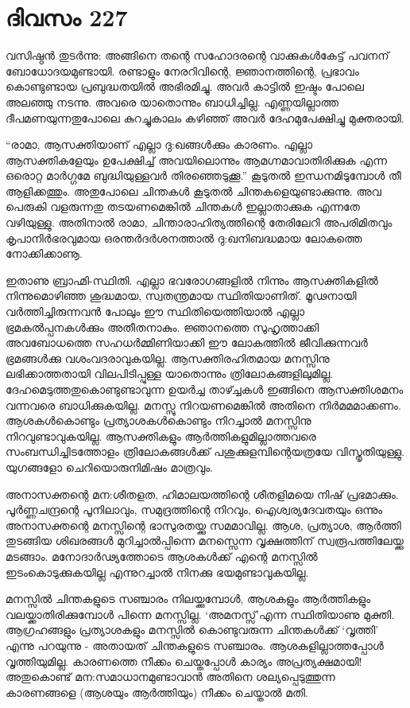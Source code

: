 \section{ദിവസം 227}


വസിഷ്ഠൻ തുടർന്നു: അങ്ങിനെ തന്റെ സഹോദരന്റെ വാക്കുകള്‍കേട്ട് പവനന്‌ ബോധോദയമുണ്ടായി. രണ്ടാളും നേരറിവിന്റെ, ജ്ഞാനത്തിന്റെ, പ്രഭാവം കൊണ്ടുണ്ടായ പ്രബുദ്ധതയിൽ അഭിരമിച്ചു. അവർ കാട്ടിൽ ഇഷ്ടം പോലെ അലഞ്ഞു നടന്നു. അവരെ യാതൊന്നും ബാധിച്ചില്ല. എണ്ണയില്ലാത്ത ദീപമണയുന്നതുപോലെ കുറച്ചുകാലം കഴിഞ്ഞ് അവർ ദേഹമുപേക്ഷിച്ചു മുക്തരായി.

“രാമാ, ആസക്തിയാണ്‌ എല്ലാ ദു:ഖങ്ങൾക്കും കാരണം. എല്ലാ ആസക്തികളേയും ഉപേക്ഷിച്ച് അവയിലൊന്നും ആമഗ്നമാവാതിരിക്കുക എന്ന ഒരൊറ്റ മാർഗ്ഗമേ ബുദ്ധിയുള്ളവർ തിരഞ്ഞെടുക്കൂ.” കൂടുതൽ ഇന്ധനമിടുമ്പോൾ തീ ആളിക്കത്തും. അതുപോലെ ചിന്തകൾ കൂടുതൽ ചിന്തകളെയുണ്ടാക്കുന്നു. അവ പെരുകി വളരുന്നതു തടയണമെങ്കിൽ ചിന്തകൾ ഇല്ലാതാക്കുക എന്നതേ വഴിയുള്ളു. അതിനാൽ രാമാ, ചിന്താരാഹിത്യത്തിന്റെ തേരിലേറി അപരിമിതവും കൃപാനിർഭരവുമായ ഒരന്തര്‍ദർശനത്താൽ ദു:ഖനിബദ്ധമായ ലോകത്തെ നോക്കിക്കാണൂ.

ഇതാണു ബ്രാഹ്മി-സ്ഥിതി. എല്ലാ ഭവരോഗങ്ങളിൽ നിന്നും ആസക്തികളിൽ നിന്നുമൊഴിഞ്ഞ ശുദ്ധമായ, സ്വതന്ത്രമായ സ്ഥിതിയാണിത്. മൂഢനായി വർത്തിച്ചിരുന്നവൻ പോലും ഈ സ്ഥിതിയെത്തിയാൽ എല്ലാ ഭ്രമകൽപ്പനകൾക്കും അതീതനാകും. ജ്ഞാനത്തെ സുഹൃത്താക്കി അവബോധത്തെ സഹധർമ്മിണിയാക്കി ഈ ലോകത്തിൽ ജീവിക്കുന്നവർ ഭ്രമങ്ങൾക്കു വശംവദരാവുകയില്ല. ആസക്തിരഹിതമായ മനസ്സിനു ലഭിക്കാത്തതായി വിലപിടിപ്പുള്ള യാതൊന്നും ത്രിലോകങ്ങളിലുമില്ല. ദേഹമെടുത്തതുകൊണ്ടുണ്ടാവുന്ന ഉയർച്ച താഴ്ച്ചകൾ ഇങ്ങിനെ ആസക്തിശമനം വന്നവരെ ബാധിക്കുകയില്ല. മനസ്സു നിറയണമെങ്കിൽ അതിനെ നിർമമമാക്കണം. ആശകൾകൊണ്ടും പ്രത്യാശകൾകൊണ്ടും നിറച്ചാൽ മനസ്സിനു നിറവുണ്ടാവുകയില്ല. ആസക്തികളും ആർത്തികളുമില്ലാത്തവരെ സംബന്ധിച്ചിടത്തോളം  ത്രിലോകങ്ങൾക്ക്  പശുക്കുളമ്പിന്റെയത്രയേ വിസ്തൃതിയുള്ളു. യുഗങ്ങളോ ചെറിയൊരുനിമിഷം മാത്രവും.

അനാസക്തന്റെ മന:ശീതളത, ഹിമാലയത്തിന്റെ ശീതളിമയെ നിഷ് പ്രഭമാക്കും. പൂർണ്ണചന്ദ്രന്റെ പൂനിലാവും, സമുദ്രത്തിന്റെ നിറവും, ഐശ്വര്യദേവതയും ഒന്നും അനാസക്തന്റെ മനസ്സിന്റെ ഭാസുരതയ്ക്കു സമമാവില്ല. ആശ, പ്രത്യാശ, ആർത്തി തുടങ്ങിയ ശിഖരങ്ങൾ മുറിച്ചാൽപ്പിന്നെ മനസ്സെന്ന വൃക്ഷത്തിന്‌ സ്വരൂപത്തിലേയ്ക്കു മടങ്ങാം. മനോദാർഢ്യത്തോടെ ആശകൾക്ക് എന്റെ മനസ്സിൽ ഇടംകൊടുക്കുകയില്ല എന്നുറച്ചാൽ നിനക്കു ഭയമുണ്ടാവുകയില്ല.

മനസ്സിൽ ചിന്തകളുടെ സഞ്ചാരം നിലയ്ക്കുമ്പോൾ, ആശകളും ആർത്തികളും വലയ്ക്കാതിരിക്കുമ്പോൾ പിന്നെ മനസ്സില്ല. ‘അമനസ്സ്’എന്ന സ്ഥിതിയാണു മുക്തി. ആഗ്രഹങ്ങളും പ്രത്യാശകളും മനസ്സിൽ കൊണ്ടുവരുന്ന ചിന്തകൾക്ക് ‘വൃത്തി’ എന്നു പറയുന്നു - അതായത് ചിന്തകളുടെ സഞ്ചാരം. ആശകളില്ലാത്തപ്പോൾ വൃത്തിയുമില്ല. കാരണത്തെ നീക്കം ചെയ്തപ്പോൾ കാര്യം അപ്രത്യക്ഷമായി! അതുകൊണ്ട് മന:സമാധാനമുണ്ടാവാൻ അതിനെ ശല്യപ്പെടുത്തുന്ന കാരണങ്ങളെ (ആശയും ആർത്തിയും) നീക്കം ചെയ്താൽ മതി.
